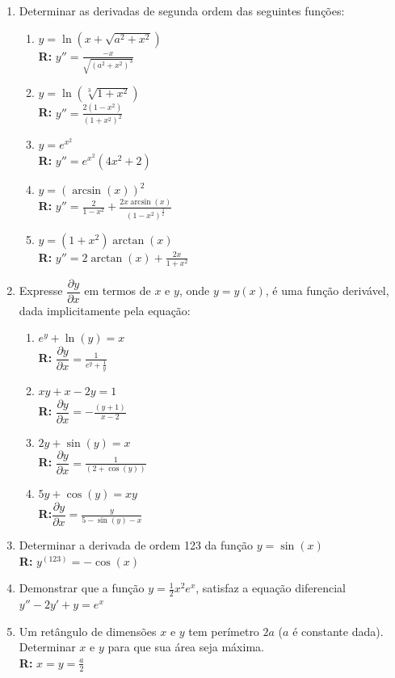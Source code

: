 \documentclass[oneside,a4paper,12pt]{article}
\begin{document}
\begin{enumerate}
	
	\item Determinar as derivadas de segunda ordem das seguintes funções:
	\begin{enumerate}
		\item $y = \ln(x + \sqrt{a^2 + x^2})$ \\ {\bf R:} $y'' = \frac{-x}{\sqrt{(a^2 + x^2)^3}}$
		\item $y = \ln(\sqrt[3]{1+x^2})$ \\ {\bf R:} $y'' = \frac{2(1-x^2)}{(1+x^2)^2}$
		\item $y = e^{x^2}$ \\ {\bf R:} $y'' = e^{x^2}(4x^2+2)$
		\item $y = (\arcsin(x))^2$ \\ {\bf R:} $y'' = \frac{2}{1-x^2}+ \frac{2x\arcsin(x)}{(1-x^2)^{\frac{3}{2}}}$
		\item $y = (1 + x^2)\arctan(x)$ \\ {\bf R:} $y'' = 2\arctan(x) + \frac{2x}{1+x^2}$
	\end{enumerate}

	\item Expresse $\dfrac{\partial y}{\partial x}$ em termos de $x$ e $y$, onde $y = y(x)$, é uma função derivável, dada implicitamente pela equação:
	\begin{enumerate}
		\item $e^{y} + \ln(y) = x$ \\ {\bf R:} $\dfrac{\partial y}{\partial x} = \frac{1}{e^y + \frac{1}{y}}$
		\item $xy + x - 2y = 1$ \\ {\bf R:} $\dfrac{\partial y}{\partial x} = -\frac{(y + 1)}{x - 2}$
		\item $2y + \sin(y) = x$ \\ {\bf R:} $\dfrac{\partial y}{\partial x} = \frac{1}{(2 + \cos(y))}$
		\item $5y + \cos(y) = xy$ \\ {\bf R:}$\dfrac{\partial y}{\partial x} = \frac{y}{5 - \sin(y) - x}$
	\end{enumerate}
	
	\item Determinar a derivada de ordem 123 da função $y = \sin(x)$ \\ {\bf R:} $y^{(123)} = - \cos(x)$
	
	\item Demonstrar que a função $y = \frac{1}{2}x^2e^x$, satisfaz a equação diferencial $y'' - 2y' + y = e^x$
	
	\item Um retângulo de dimensões $x$ e $y$ tem perímetro $2a$ ($a$ é constante dada). Determinar $x$ e $y$ para que sua área seja máxima. \\ {\bf R:} $x=y=\frac{a}{2}$
	

\end{enumerate}
\end{document}

